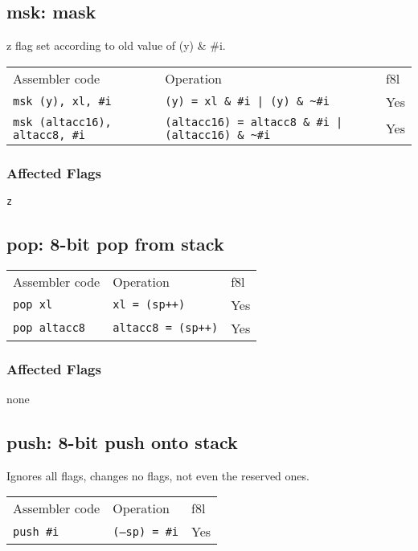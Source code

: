 \documentclass{book}
\begin{document}
\subsection{msk: mask}

z flag set according to old value of  (y) \& \#i.

\begin{tabular}{l l l}
Assembler code                        & Operation                                                    & f8l \\
\texttt{msk (y), xl, \#i}             & \texttt{(y) = xl \& \#i | (y) \& \~{}\#i}                    & Yes \\
\texttt{msk (altacc16), altacc8, \#i} & \texttt{(altacc16) = altacc8 \& \#i | (altacc16) \& \~{}\#i} & Yes \\
\end{tabular}

\subsubsection*{Affected Flags}

\texttt{z}

\subsection{pop: 8-bit pop from stack}

\begin{tabular}{l l l}
Assembler code       & Operation                 & f8l \\
\texttt{pop xl}      & \texttt{xl = (sp++)}      & Yes \\
\texttt{pop altacc8} & \texttt{altacc8 = (sp++)} & Yes \\
\end{tabular}

\subsubsection*{Affected Flags}

none


\subsection{push: 8-bit push onto stack}

Ignores all flags, changes no flags, not even the reserved ones.

\begin{tabular}{l l l}
Assembler code    & Operation             & f8l \\
\texttt{push \#i} & \texttt{(--sp) = \#i} & Yes
\end{tabular}
\end{document}
